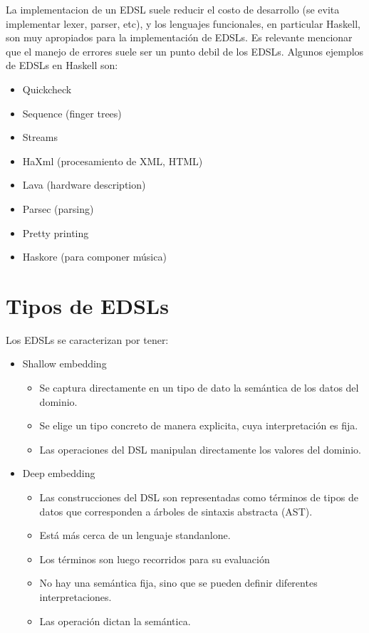 \documentclass{article}
\begin{document}
La implementacion de un EDSL suele reducir el costo de desarrollo (se evita implementar lexer, parser, etc), y los lenguajes funcionales, en particular Haskell, son muy
apropiados para la implementación de EDSLs. Es relevante mencionar que el manejo de errores suele ser un punto debil de los EDSLs. Algunos ejemplos de EDSLs en Haskell son:

\begin{itemize}
\item Quickcheck
\item Sequence (finger trees)
\item Streams
\item HaXml (procesamiento de XML, HTML)
\item Lava (hardware description)
\item Parsec (parsing)
\item Pretty printing
\item Haskore (para componer música)
\end{itemize}

\newpage

\section{Tipos de EDSLs}\label{sec:tipos_de_edsls}
    
\noindent Los EDSLs se caracterizan por tener:

\begin{itemize}
\item Shallow embedding
\begin{itemize}
\item Se captura directamente en un tipo de dato la semántica de los datos del dominio.
\item Se elige un tipo concreto de manera explicita, cuya interpretación es fija.
\item Las operaciones del DSL manipulan directamente los valores del dominio.
\end{itemize}
\item Deep embedding
\begin{itemize}
\item Las construcciones del DSL son representadas como términos de tipos de datos que corresponden a árboles de sintaxis abstracta (AST).
\item Está más cerca de un lenguaje standanlone.
\item Los términos son luego recorridos para su evaluación
\item No hay una semántica fija, sino que se pueden definir diferentes interpretaciones.
\item Las operación dictan la semántica.
\end{itemize}
\end{itemize}
\end{document}
